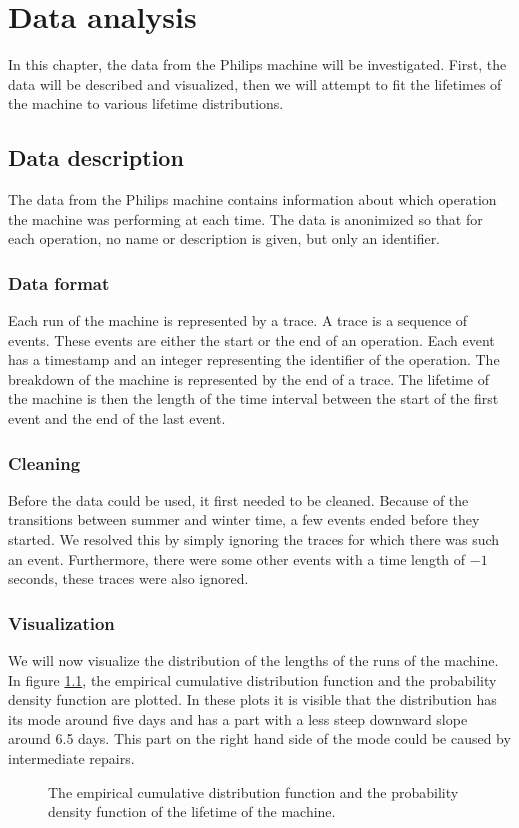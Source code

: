 \chapter{Data analysis}\label{chapter:DataAnalysis}
In this chapter, the data from the Philips machine will be investigated.
First, the data will be described and visualized, then we will attempt to fit the lifetimes of the machine to various lifetime distributions.
\section{Data description}
The data from the Philips machine contains information about which operation the machine was performing at each time.
The data is anonimized so that for each operation, no name or description is given, but only an identifier.
\subsection{Data format}
Each run of the machine is represented by a trace.
A trace is a sequence of events.
These events are either the start or the end of an operation.
Each event has a timestamp and an integer representing the identifier of the operation.
The breakdown of the machine is represented by the end of a trace.
The lifetime of the machine is then the length of the time interval between the start of the first event and the end of the last event.

\subsection{Cleaning}
Before the data could be used, it first needed to be cleaned.
Because of the transitions between summer and winter time, a few events ended before they started.
We resolved this by simply ignoring the traces for which there was such an event.
Furthermore, there were some other events with a time length of $-1$ seconds, these traces were also ignored.

\subsection{Visualization}
We will now visualize the distribution of the lengths of the runs of the machine.
In figure \ref{figure:distribution}, the empirical cumulative distribution function and the probability density function are plotted.
In these plots it is visible that the distribution has its mode around five days and has a part with a less steep downward slope around 6.5 days.
This part on the right hand side of the mode could be caused by intermediate repairs.
\begin{figure}[H]
	\setlength{}
	
	\setlength{}
	
	\caption{The empirical cumulative distribution function and the probability density function of the lifetime of the machine.}
	\label{figure:distribution} 
\end{figure}

